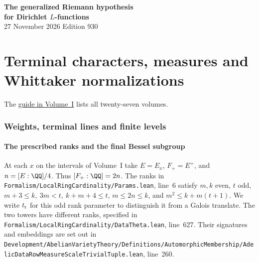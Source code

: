 \documentclass[a4paper,11pt]{article}
\theoremstyle{definition}
\theoremstyle{remark}
\newcommand{\srcloc}[2]{{\small\nolinkurl{#1.lean}}, line~#2}
\numberwithin{equation}{section}
\begin{document}
\setcounter{part}{17}
\thispagestyle{plain}\begin{center}
{\LARGE\bfseries The generalized Riemann hypothesis\\[2pt]for Dirichlet \(L\)-functions}\\[6pt]
{\small 27 November 2026 \quad\textperiodcentered\quad Edition 930}\end{center}
\part{Terminal characters, measures and Whittaker normalizations}\label{part:XVIII}
\begin{abstract}\noindent We fix the marked characters, measures and integral highest lines at the terminal level. The compact projections and the Whittaker pairing determine the normalizations on residue flags and their restriction subspaces.\end{abstract}
\setcounter{section}{91}
\noindent The \hyperref[seriesguide]{guide in Volume~I} lists all twenty-seven volumes.
\begingroup\small\setlength{\parskip}{0pt}\tableofcontents\endgroup
\clearpage

\section{Weights, terminal lines and finite levels}\label{nav:g-VIII-0}\label{nav:volume-XVIII}

\subsection{The prescribed ranks and the final Bessel subgroup}\label{nav:V-06}
\label{sec:ranks47}

At each \(x\) on the intervals of Volume~I take \(E=E_x\), \(F_+=E^+\),
and \(n=[E:\QQ]/4\). Thus \([F_+:\QQ]=2n\).
The ranks in \srcloc{Formalism/LocalRingCardinality/Params}{6} satisfy
\(m,k\) even, \(t\) odd, \(m+3\le k,\ 3m<t,\ k+m+4\le t\),
\(m\le 2n\le k\), and \(m^2\le k+m(t+1)\). We write \(t_{\rm r}\)
for this odd rank parameter to distinguish it from a Galois translate.
The two towers have different ranks, specified in
\srcloc{Formalism/LocalRingCardinality/DataTheta}{627}. Their signatures
and embeddings are set out in
\srcloc{Development/AbelianVarietyTheory/Definitions/AutomorphicMembership/AdelicDataRowMeasureScaleTrivialTuple}{260}.
\end{document}

